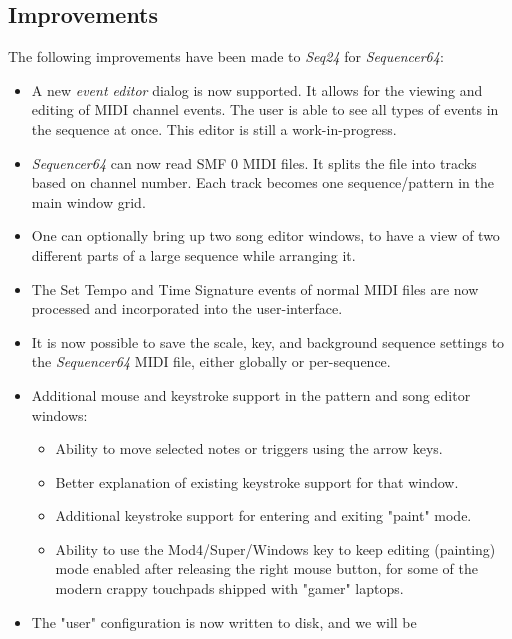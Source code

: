 \documentclass[
 11pt,
 twoside,
 a4paper,
 headinclude,
 footinclude,
 final                                 %
]{article}
\begin{document}
\subsection{Improvements}
\label{subsec:improvements}

   The following improvements have been made to \textsl{Seq24} for
   \textsl{Sequencer64}:

   \begin{itemize}
      \item A new \textsl{event editor} dialog is now supported.
         It allows for the viewing and editing of MIDI channel events.
         The user is able to see all types of events in the sequence at
         once.  This editor is still a work-in-progress.
      \item \textsl{Sequencer64} can now read SMF 0 MIDI files.  It splits
         the file into tracks based on channel number.  Each track becomes one
         sequence/pattern in the main window grid.
      \item One can optionally bring up two song editor windows, to have a view
         of two different parts of a large sequence while arranging it.
      \item The Set Tempo and Time Signature events of normal MIDI files are
         now processed and incorporated into the user-interface.
      \item It is now possible to save the scale, key, and background sequence
         settings to the \textsl{Sequencer64} MIDI file, either globally or
         per-sequence.
      \item Additional mouse and keystroke support in the pattern and song
         editor windows:
      \begin{itemize}
         \item Ability to move selected notes or triggers using the arrow keys.
         \item Better explanation of existing keystroke support for that window.
         \item Additional keystroke support for entering and exiting "paint"
            mode.
         \item Ability to use the Mod4/Super/Windows key to keep editing
            (painting) mode enabled after releasing the right mouse button,
            for some of the modern crappy touchpads shipped with
            "gamer" laptops.
      \end{itemize}
      \item The "user" configuration is now written to disk, and we will be

\end{itemize}
\end{document}
